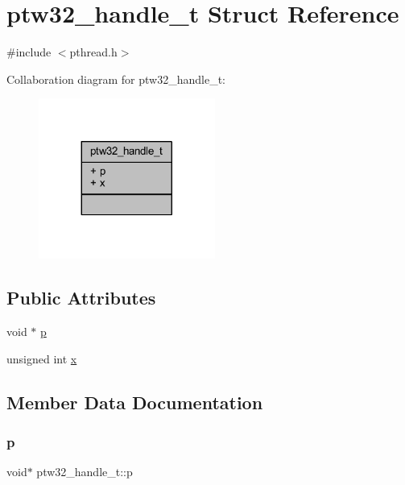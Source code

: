 \hypertarget{structptw32__handle__t}{}\section{ptw32\+\_\+handle\+\_\+t Struct Reference}
\label{structptw32__handle__t}


{\ttfamily \#include $<$pthread.\+h$>$}



Collaboration diagram for ptw32\+\_\+handle\+\_\+t\+:
\nopagebreak
\begin{figure}[H]
\begin{center}
\leavevmode
\includegraphics[width=164pt]{structptw32__handle__t__coll__graph}
\end{center}
\end{figure}
\subsection*{Public Attributes}
\begin{DoxyCompactItemize}
\item 
void $\ast$ \mbox{\hyperlink{structptw32__handle__t_ad5c9721a0ae3e8d13766c5d901c8a157}{p}}
\item 
unsigned int \mbox{\hyperlink{structptw32__handle__t_a156e4e4394eb30aa3f977794496db34b}{x}}
\end{DoxyCompactItemize}


\subsection{Member Data Documentation}
\mbox{\label{structptw32__handle__t_ad5c9721a0ae3e8d13766c5d901c8a157}} 
\subsubsection{\texorpdfstring{p}{p}}
{\footnotesize\ttfamily void$\ast$ ptw32\+\_\+handle\+\_\+t\+::p}

